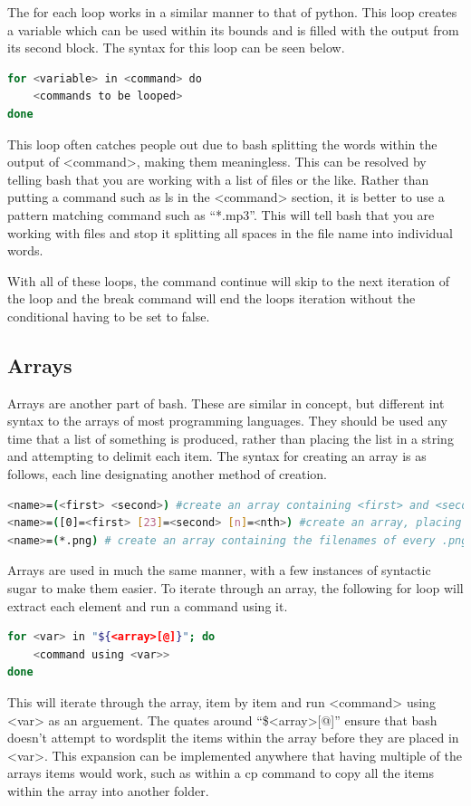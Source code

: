 \documentclass[a4paper,11pt]{report}
\begin{document}
			The for each loop works in a similar manner to that of python. 
			This loop creates a variable which can be used within its bounds and is filled with the output from its second block. 
			The syntax for this loop can be seen below. 
			\begin{lstlisting}[language=bash,numbers=none]
for <variable> in <command> do
	<commands to be looped>
done
			\end{lstlisting}
			This loop often catches people out due to bash splitting the words within the output of <command>, making them meaningless. 
			This can be resolved by telling bash that you are working with a list of files or the like. 
			Rather than putting a command such as ls in the <command> section, it is better to use a pattern matching command such as ``*.mp3''. 
			This will tell bash that you are working with files and stop it splitting all spaces in the file name into individual words. 

			With all of these loops, the command continue will skip to the next iteration of the loop and the break command will end the loops iteration without the conditional having to be set to false. 

		\subsection{Arrays}
			Arrays are another part of bash. 
			These are similar in concept, but different int syntax to the arrays of most programming languages. 
			They should be used any time that a list of something is produced, rather than placing the list in a string and attempting to delimit each item. 
			The syntax for creating an array is as follows, each line designating another method of creation. 
			\begin{lstlisting}[language=bash,numbers=none]
<name>=(<first> <second>) #create an array containing <first> and <second>
<name>=([0]=<first> [23]=<second> [n]=<nth>) #create an array, placing items in specific positions. 
<name>=(*.png) # create an array containing the filenames of every .png file in the current directory. 
			\end{lstlisting}

			Arrays are used in much the same manner, with a few instances of syntactic sugar to make them easier. 
			To iterate through an array, the following for loop will extract each element and run a command using it. 
			\begin{lstlisting}[language=bash,numbers=none]
for <var> in "${<array>[@]}"; do
	<command using <var>>
done
			\end{lstlisting} 
			This will iterate through the array, item by item and run <command> using <var> as an arguement. 
			The quates around ``\$<array>[@]'' ensure that bash doesn't attempt to wordsplit the items within the array before they are placed in <var>.
			This expansion can be implemented anywhere that having multiple of the arrays items would work, such as within a cp command to copy all the items within the array into another folder. 
\end{document}
